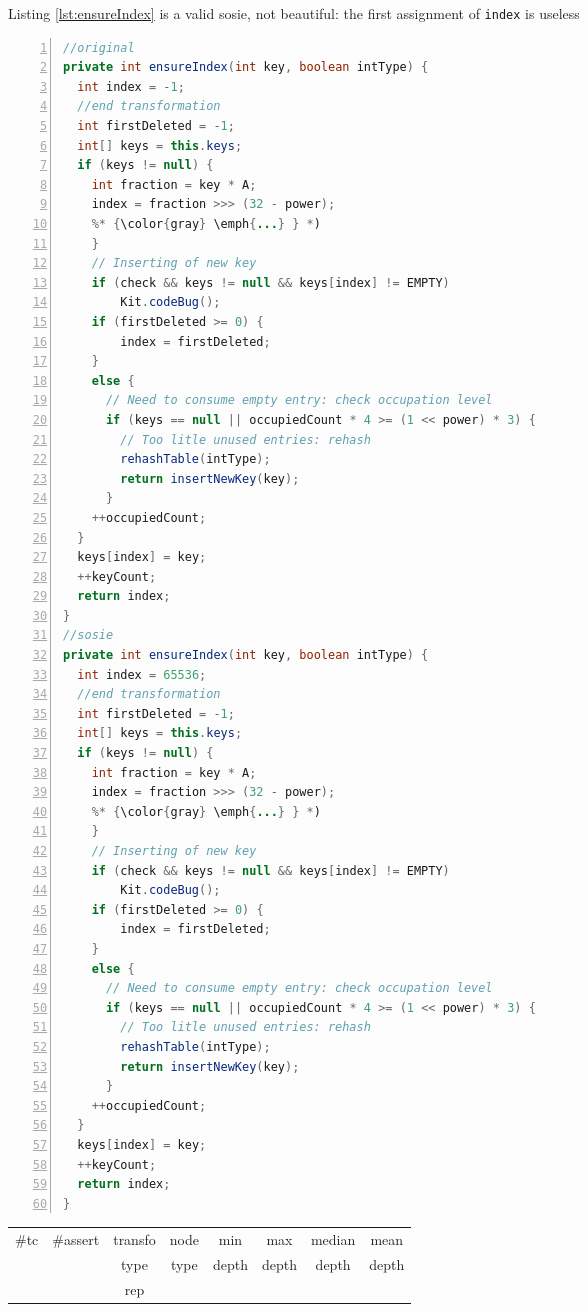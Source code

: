 Listing \ref{lst:ensureIndex} is a valid sosie, not beautiful: the first assignment of \texttt{index} is useless

\begin{minipage}{\columnwidth}
\begin{lstlisting}[caption={\texttt{ensureIndex} in Rhino and a sosie},label=lst:ensureIndex,language=java,numbers=left]
//original
private int ensureIndex(int key, boolean intType) {
  int index = -1;
  //end transformation
  int firstDeleted = -1;
  int[] keys = this.keys;
  if (keys != null) {
    int fraction = key * A;
    index = fraction >>> (32 - power);
    %* {\color{gray} \emph{...} } *)
    }
    // Inserting of new key
    if (check && keys != null && keys[index] != EMPTY)
        Kit.codeBug();
    if (firstDeleted >= 0) {
        index = firstDeleted;
    }
    else {
      // Need to consume empty entry: check occupation level
      if (keys == null || occupiedCount * 4 >= (1 << power) * 3) {
        // Too litle unused entries: rehash
        rehashTable(intType);
        return insertNewKey(key);
      }
    ++occupiedCount;
  }
  keys[index] = key;
  ++keyCount;
  return index;
}
//sosie
private int ensureIndex(int key, boolean intType) {
  int index = 65536;
  //end transformation
  int firstDeleted = -1;
  int[] keys = this.keys;
  if (keys != null) {
    int fraction = key * A;
    index = fraction >>> (32 - power);
    %* {\color{gray} \emph{...} } *)
    }
    // Inserting of new key
    if (check && keys != null && keys[index] != EMPTY)
        Kit.codeBug();
    if (firstDeleted >= 0) {
        index = firstDeleted;
    }
    else {
      // Need to consume empty entry: check occupation level
      if (keys == null || occupiedCount * 4 >= (1 << power) * 3) {
        // Too litle unused entries: rehash
        rehashTable(intType);
        return insertNewKey(key);
      }
    ++occupiedCount;
  }
  keys[index] = key;
  ++keyCount;
  return index;
}
\end{lstlisting}
\tabcolsep=0.11cm
\begin{tabular}{>{\small}c>{\small}c>{\small}c>{\small}c>{\small}c>{\small}c>{\small}c>{\small}c}
\hline
\rowcolor{lightgray} \#tc & \#assert & transfo & node & min & max & median & mean   \\
\rowcolor{lightgray}  & & type & type & depth  & depth & depth & depth  \\ 
\hline
&  & rep &  &  &  &  & \\
\hline
\end{tabular}
\end{minipage}